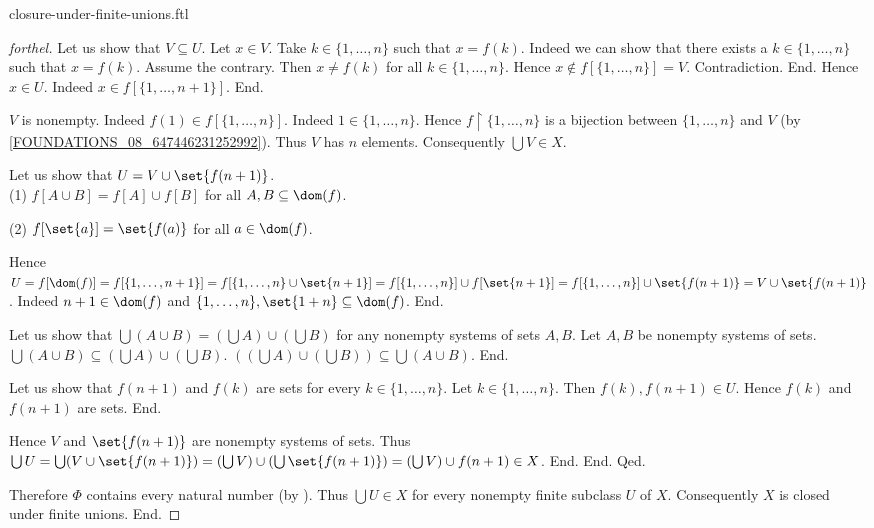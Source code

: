 \documentclass{naproche-library}
\begin{document}
\begin{smodule}{closure-under-finite-unions.ftl}
\begin{proof}[forthel]
            Let us show that $V \subseteq U$.
              Let $x \in V$.
              Take $k \in \{ 1, \dots, n \}$ such that $x = f(k)$.
              Indeed we can show that there exists a $k \in \{ 1, \dots, n \}$ such that $x = f(k)$.
                Assume the contrary.
                Then $x \neq f(k)$ for all $k \in \{ 1, \dots, n \}$.
                Hence $x \notin f[\{ 1, \dots, n \}] = V$.
                Contradiction.
              End.
              Hence $x \in U$.
              Indeed $x \in f[\{ 1, \dots, n + 1 \}]$.
            End.

            $V$ is nonempty.
            Indeed $f(1) \in f[\{ 1, \dots, n \}]$.
            Indeed $1 \in \{ 1, \dots, n \}$.
            Hence $f \restriction \{ 1, \dots, n \}$ is a bijection between $\{ 1, \dots, n \}$ and $V$ (by \cref{FOUNDATIONS_08_647446231252992}).
            Thus $V$ has $n$ elements.
            Consequently $\bigcup V \in X$.

            Let us show that $U = V \cup \set{f(n + 1)}$. \\
              (1) $f[A \cup B] = f[A] \cup f[B]$ for all $A, B \subseteq \dom(f)$.

              (2) $f[\set{a}] = \set{f(a)}$ for all $a \in \dom(f)$.

              Hence $U
                = f[\dom(f)]
                = f[\{ 1, \dots, n + 1 \}]
                = f[\{ 1, \dots, n \} \cup \set{n + 1}]
                = f[\{ 1, \dots, n \}] \cup f[\set{n + 1}]
                = f[\{ 1, \dots, n \}] \cup \set{f(n + 1)}
                = V \cup \set{f(n + 1)}$.
              Indeed $n + 1 \in \dom(f)$ and $\{ 1, \dots, n \}, \set{1 + n} \subseteq \dom(f)$.
            End.

            Let us show that $\bigcup (A \cup B) = (\bigcup A) \cup (\bigcup B)$ for any nonempty systems of sets $A, B$.
              Let $A, B$ be nonempty systems of sets.
              $\bigcup (A \cup B) \subseteq (\bigcup A) \cup (\bigcup B)$.
              $((\bigcup A) \cup (\bigcup B)) \subseteq \bigcup (A \cup B)$. %
            End.

            Let us show that $f(n + 1)$ and $f(k)$ are sets for every $k \in \{ 1, \dots, n \}$.
              Let $k \in \{ 1, \dots, n \}$.
              Then $f(k), f(n + 1) \in U$.
              Hence $f(k)$ and $f(n + 1)$ are sets.
            End.

            Hence $V$ and $\set{f(n + 1)}$ are nonempty systems of sets.
            Thus $\bigcup U
              = \bigcup (V \cup \set{f(n + 1)})
              = (\bigcup V) \cup (\bigcup \set{f(n + 1)})
              = (\bigcup V) \cup f(n + 1)
              \in X$.
          End.
        End.
      Qed.

      Therefore $\Phi$ contains every natural number (by ).
      Thus $\bigcup U \in X$ for every nonempty finite subclass $U$ of $X$.
      Consequently $X$ is closed under finite unions.
    End.
  \end{proof}
\end{smodule}
\end{document}

